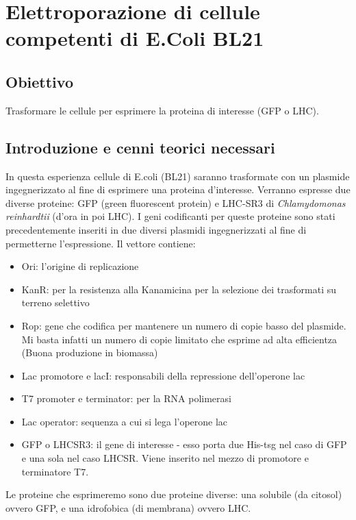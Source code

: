 \documentclass{extarticle}
\begin{document}
\newpage
\section{Elettroporazione di cellule competenti di E.Coli BL21}
\subsection*{Obiettivo}
Trasformare le cellule per esprimere la proteina di interesse (GFP o LHC).
\subsection*{Introduzione e cenni teorici necessari}
In questa esperienza cellule di E.coli (BL21) saranno trasformate con un plasmide ingegnerizzato 
al fine di esprimere una proteina d'interesse. Verranno espresse due diverse proteine: 
GFP (green fluorescent protein) e LHC-SR3 di \textit{Chlamydomonas reinhardtii} (d'ora in poi LHC). 
I geni codificanti per queste proteine sono stati precedentemente inseriti in due diversi plasmidi ingegnerizzati 
al fine di permetterne l'espressione. 
Il vettore contiene:
\begin{itemize}
    \item Ori: l'origine di replicazione
    \item KanR: per la resistenza alla Kanamicina per la selezione dei trasformati su terreno selettivo
    \item Rop: gene che codifica per mantenere un numero di copie basso del plasmide.
        \subitem Mi basta infatti un numero di copie limitato che esprime ad alta efficientza 
        (Buona produzione in biomassa)
    \item Lac promotore e lacI: responsabili della repressione dell'operone lac
    \item T7 promoter e terminator: per la RNA polimerasi 
    \item Lac operator: sequenza a cui si lega l'operone lac
    \item GFP o LHCSR3: il gene di interesse - esso porta due His-tsg nel caso di GFP e una sola nel caso LHCSR.
        \subitem Viene inserito nel mezzo di promotore e terminatore T7.
\end{itemize}
Le proteine che esprimeremo sono due proteine diverse: una solubile (da citosol) ovvero GFP, e una idrofobica (di membrana) ovvero LHC.\\
\end{document}
